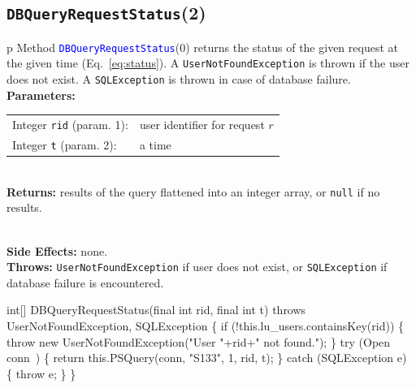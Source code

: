 \subsection{\texttt{DBQueryRequestStatus}(2)}
\begin{tabular}{p{\textwidth}}
\toprule
{}
Method \textcolor{blue}{{\tt{}\protect{}DBQueryRequestStatus}}(0) returns the status of
the given request at the given time (Eq.~\ref{eq:status}).
A {\tt{}UserNotFoundException} is thrown if the user does not exist.
A {\tt{}SQLException} is thrown in case of database failure.\\
\midrule
\textbf{Parameters:} \\
\begin{tabular}{lp{116mm}}
Integer {\tt{}rid} (param. 1):&user identifier for request $r$\\
Integer {\tt{}t} (param. 2):&a time
\end{tabular}\\
\textbf{Returns:} results of the query flattened into an integer array, or
{\tt{}null} if no results.

\\
\textbf{Side Effects:} none.\\
\textbf{Throws:} {\tt{}UserNotFoundException} if user does not exist, or
{\tt{}SQLException} if database failure is encountered.\\
\bottomrule
\end{tabular}
\nwenddocs{}\endmoddef{}
int[] DBQueryRequestStatus(final int rid, final int t)
throws UserNotFoundException, SQLException \{
  if (!this.lu_users.containsKey(rid)) \{
    throw new UserNotFoundException("User "+rid+" not found.");
  \}
  try (\LA{}Open \code{}conn\edoc{}~{\nwtagstyle{}}\RA{}) \{
    return this.PSQuery(conn, "S133", 1, rid, t);
  \} catch (SQLException e) \{
    throw e;
  \}
\}
\eatline
{}\nwendcode{}\nwdocspar
